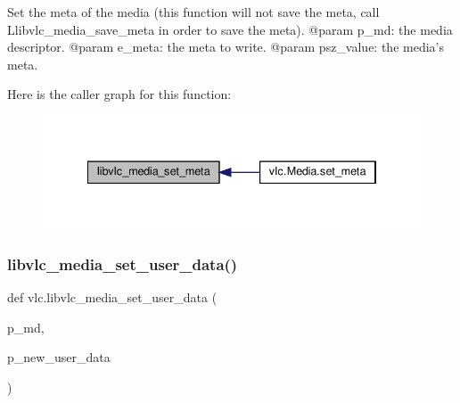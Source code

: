 \begin{DoxyVerb}Set the meta of the media (this function will not save the meta, call
L{libvlc_media_save_meta} in order to save the meta).
@param p_md: the media descriptor.
@param e_meta: the meta to write.
@param psz_value: the media's meta.
\end{DoxyVerb}
 Here is the caller graph for this function\+:
\nopagebreak
\begin{figure}[H]
\begin{center}
\leavevmode
\includegraphics[width=334pt]{namespacevlc_aaef688f523878755ccf5425b1c5ea3a1_icgraph}
\end{center}
\end{figure}
\mbox{\label{namespacevlc_affc60076c09dcc9f852525c10e09c095}} 
\subsubsection{\texorpdfstring{libvlc\+\_\+media\+\_\+set\+\_\+user\+\_\+data()}{libvlc\_media\_set\_user\_data()}}
{\footnotesize\ttfamily def vlc.\+libvlc\+\_\+media\+\_\+set\+\_\+user\+\_\+data (\begin{DoxyParamCaption}\item[{}]{p\+\_\+md,  }\item[{}]{p\+\_\+new\+\_\+user\+\_\+data }\end{DoxyParamCaption})}

